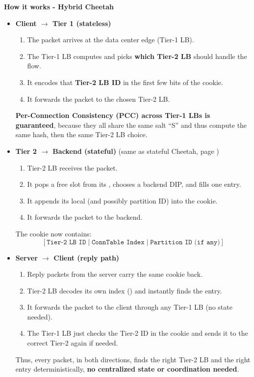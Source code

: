 \highspace
\begin{flushleft}
    \textcolor{Green3}{ \textbf{How it works - Hybrid Cheetah}}
\end{flushleft}
\begin{itemize}
    \item \textcolor{Green3}{\textbf{Client $\to$ Tier 1 (stateless)}}
    \begin{enumerate}
        \item The packet arrives at the data center edge (Tier-1 LB).
        \item The Tier-1 LB computes  and picks \textbf{which Tier-2 LB} should handle the flow.
        \item It encodes that \textbf{Tier-2 LB ID} in the first few bits of the cookie.
        \item It forwards the packet to the chosen Tier-2 LB.
    \end{enumerate}
    \textbf{Per-Connection Consistency (PCC) across Tier-1 LBs is guaranteed}, because they all share the same salt ``S'' and thus compute the same hash, then the same Tier-2 LB choice.


    \item \textcolor{DarkOrange3}{\textbf{Tier 2 $\to$ Backend (stateful)}} (same as stateful Cheetah, page )
    \begin{enumerate}
        \item Tier-2 LB receives the packet.
        \item It pops a free slot from its , chooses a backend DIP, and fills one  entry.
        \item It appends its local  (and possibly partition ID) into the cookie.
        \item It forwards the packet to the backend.
    \end{enumerate}
    The cookie now contains:
    \begin{equation*}
        \left[
            \texttt{Tier-2 LB ID} \;|\; \texttt{ConnTable Index} \;|\; \texttt{Partition ID (if any)}
        \right]
    \end{equation*}


    \item \textcolor{Blue2}{\textbf{Server $\to$ Client (reply path)}}
    \begin{enumerate}
        \item Reply packets from the server carry the same cookie back.
        \item Tier-2 LB decodes its own index () and instantly finds the entry.
        \item It forwards the packet to the client through any Tier-1 LB (no state needed).
        \item The Tier-1 LB just checks the Tier-2 ID in the cookie and sends it to the correct Tier-2 again if needed.
    \end{enumerate}
    Thus, every packet, in both directions, finds the right Tier-2 LB and the right  entry deterministically, \textbf{no centralized state or coordination needed}.
\end{itemize}

